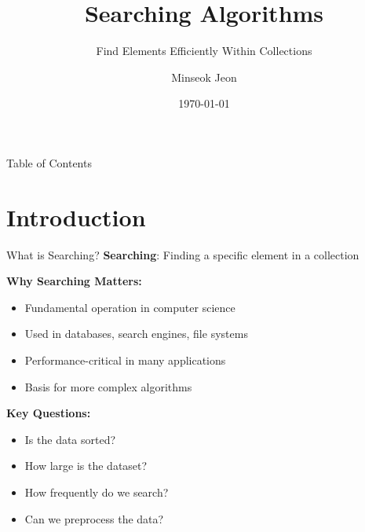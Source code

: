 \documentclass[aspectratio=169]{beamer}
\title{Searching Algorithms}
\subtitle{Find Elements Efficiently Within Collections}
\author{Minseok Jeon}
\institute{DGIST}
\date{\today}
\begin{document}
\begin{frame}
  \titlepage
\end{frame}

\begin{frame}{Table of Contents}
  \tableofcontents
\end{frame}

\section{Introduction}

\begin{frame}{What is Searching?}
  \textbf{Searching}: Finding a specific element in a collection

  \vspace{0.3cm}
  \textbf{Why Searching Matters:}
  \begin{itemize}
    \item Fundamental operation in computer science
    \item Used in databases, search engines, file systems
    \item Performance-critical in many applications
    \item Basis for more complex algorithms
  \end{itemize}

  \vspace{0.3cm}
  \textbf{Key Questions:}
  \begin{itemize}
    \item Is the data sorted?
    \item How large is the dataset?
    \item How frequently do we search?
    \item Can we preprocess the data?
  \end{itemize}
\end{frame}
\end{document}
